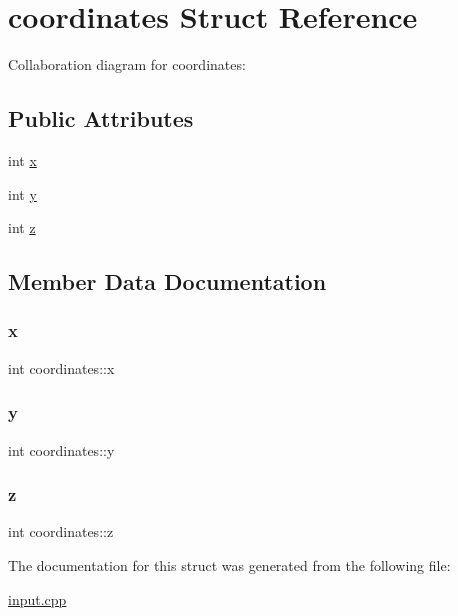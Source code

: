 \hypertarget{structcoordinates}{}\section{coordinates Struct Reference}
\label{structcoordinates}


Collaboration diagram for coordinates\+:
\subsection*{Public Attributes}
\begin{DoxyCompactItemize}
\item 
int \hyperlink{structcoordinates_a1047b469a6d5827293066e71649b9acc}{x}
\item 
int \hyperlink{structcoordinates_af7fe5145df74388a36fd7b283992e9a5}{y}
\item 
int \hyperlink{structcoordinates_a1adf14ce5b540ddde151c5bfe04b2cd8}{z}
\end{DoxyCompactItemize}


\subsection{Member Data Documentation}
\mbox{\label{structcoordinates_a1047b469a6d5827293066e71649b9acc}} 
\subsubsection{\texorpdfstring{x}{x}}
{\footnotesize\ttfamily int coordinates\+::x}

\mbox{\label{structcoordinates_af7fe5145df74388a36fd7b283992e9a5}} 
\subsubsection{\texorpdfstring{y}{y}}
{\footnotesize\ttfamily int coordinates\+::y}

\mbox{\label{structcoordinates_a1adf14ce5b540ddde151c5bfe04b2cd8}} 
\subsubsection{\texorpdfstring{z}{z}}
{\footnotesize\ttfamily int coordinates\+::z}



The documentation for this struct was generated from the following file\+:\begin{DoxyCompactItemize}
\item 
\hyperlink{input_8cpp}{input.\+cpp}\end{DoxyCompactItemize}
